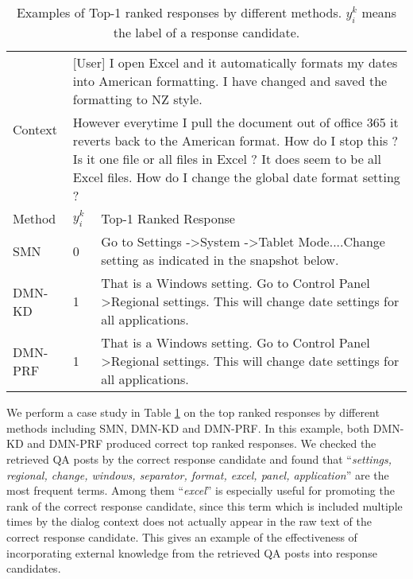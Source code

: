 \begin{table}[]
	\footnotesize
	\centering
	\caption{Examples of Top-1 ranked responses by different methods. $y_i^k$  means the label of a response candidate.}
	\vspace{-0.1in}
	\label{tab:case_study}
	\begin{tabular}{p{1.1cm}  | p{0.2cm} | p{6.3cm}}
		\hline  \hline%
		\multirow{2}{*}{Context} & \multicolumn{2}{p{6.9cm}}{ [User] I open Excel and it automatically formats my dates into American formatting. I have changed and saved the formatting to NZ style. } \\ %
		& \multicolumn{2}{p{6.9cm}}{However everytime I pull the document out of office 365 it reverts back to the American format. How do I stop this ? \quad [Agent] Is it one file  or all files in Excel ? \quad [User] It does seem to be all Excel files. How do I change the global  date format setting ? }     \\  \hline
		Method      & $y_i^k$   & Top-1 Ranked Response        \\ \hline
		SMN     & 0    & Go to Settings -\textgreater System -\textgreater Tablet Mode....Change setting as indicated in the snapshot below.         \\ \hline
		DMN-KD   & 1      & That is a Windows setting.  Go to Control Panel \textgreater Regional settings.  This will change date settings for all applications.   \\ \hline
		DMN-PRF    & 1   & That is a Windows setting.  Go to Control Panel \textgreater Regional settings.  This will change date settings for all applications.\\ \hline \hline
	\end{tabular}
\end{table}

We perform a case study in Table \ref{tab:case_study} on the top ranked responses by different methods including SMN, DMN-KD and DMN-PRF. In this example, both DMN-KD and DMN-PRF produced correct top ranked responses. We checked the retrieved QA posts by the correct response candidate and found that ``\textit{settings, regional, change, windows, separator, format, excel, panel, application}'' are the most frequent terms. Among them ``\textit{excel}'' is especially useful for promoting the rank of the correct response candidate, since this term which is included multiple times by the dialog context does not actually appear in the raw text of the correct response candidate. This gives an example of the effectiveness of incorporating external knowledge from the retrieved QA posts into response candidates.

